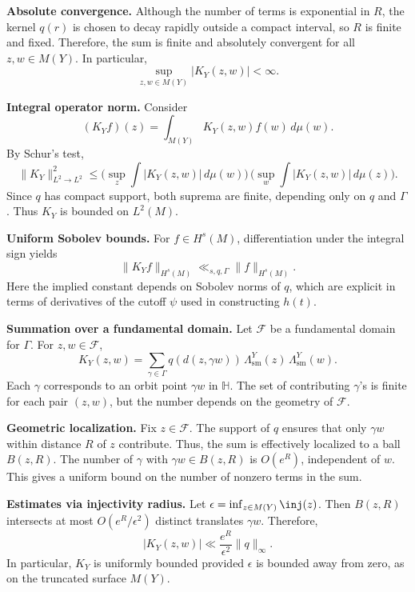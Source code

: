\noindent\textbf{Absolute convergence.}
Although the number of terms is exponential in $R$,
the kernel $q(r)$ is chosen to decay rapidly outside a compact interval,
so $R$ is finite and fixed.
Therefore, the sum is finite and absolutely convergent for all $z,w\in M(Y)$.
In particular,
\[
  \sup_{z,w\in M(Y)} |K_{Y}(z,w)| < \infty.
\]

\medskip

\noindent\textbf{Integral operator norm.}
Consider
\[
  (K_{Y}f)(z) = \int_{M(Y)} K_{Y}(z,w)f(w)\,d\mu(w).
\]
By Schur’s test,
\[
  \|K_{Y}\|_{L^{2}\to L^{2}}^{2}
  \le \Big(\sup_{z}\int |K_{Y}(z,w)|\,d\mu(w)\Big)\,
       \Big(\sup_{w}\int |K_{Y}(z,w)|\,d\mu(z)\Big).
\]
Since $q$ has compact support,
both suprema are finite, depending only on $q$ and $\Gamma$.
Thus $K_{Y}$ is bounded on $L^{2}(M)$.

\medskip

\noindent\textbf{Uniform Sobolev bounds.}
For $f\in H^{s}(M)$,
differentiation under the integral sign yields
\[
  \|K_{Y}f\|_{H^{s}(M)} \ll_{s,q,\Gamma} \|f\|_{H^{s}(M)}.
\]
Here the implied constant depends on Sobolev norms of $q$,
which are explicit in terms of derivatives of the cutoff $\psi$ used in constructing $h(t)$.

\medskip

\noindent\textbf{Summation over a fundamental domain.}
Let $\mathcal{F}$ be a fundamental domain for $\Gamma$.
For $z,w\in\mathcal{F}$,
\[
  K_{Y}(z,w) = \sum_{\gamma\in\Gamma} q(d(z,\gamma w))\,
  \Lambda^{Y}_{\mathrm{sm}}(z)\,\Lambda^{Y}_{\mathrm{sm}}(w).
\]
Each $\gamma$ corresponds to an orbit point $\gamma w$ in $\mathbb{H}$.
The set of contributing $\gamma$’s is finite for each pair $(z,w)$,
but the number depends on the geometry of $\mathcal{F}$.

\medskip

\noindent\textbf{Geometric localization.}
Fix $z\in\mathcal{F}$.
The support of $q$ ensures that only $\gamma w$ within distance $R$ of $z$ contribute.
Thus, the sum is effectively localized to a ball $B(z,R)$.
The number of $\gamma$ with $\gamma w\in B(z,R)$ is $O(e^{R})$,
independent of $w$.
This gives a uniform bound on the number of nonzero terms in the sum.

\medskip

\noindent\textbf{Estimates via injectivity radius.}
Let $\epsilon=\inf_{z\in M(Y)} \inj(z)$.
Then $B(z,R)$ intersects at most $O(e^{R}/\epsilon^{2})$ distinct translates $\gamma w$.
Therefore,
\[
  |K_{Y}(z,w)| \ll \frac{e^{R}}{\epsilon^{2}}\|q\|_{\infty}.
\]
In particular, $K_{Y}$ is uniformly bounded provided $\epsilon$ is bounded away from zero,
as on the truncated surface $M(Y)$.


